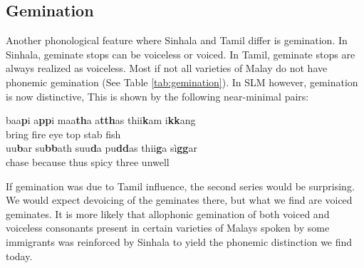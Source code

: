 \documentclass[a4paper,10pt]{article}
\newcommand{\ttrs}[2]{\parbox{3.5cm}{\em \textbf{#1} \em \\ `#2'}}
\newcommand{\nixbox}{\fbox{\parbox{2cm}{~ \\ ~}}}
\begin{document}
% 

\subsection{Gemination}
Another phonological feature where Sinhala and Tamil differ is gemination. In Sinhala, geminate stops can be voiceless or voiced. In Tamil, geminate stops are always realized as voiceless. Most if not all varieties of Malay do not have phonemic gemination (See Table \ref{tab:gemination}). In SLM however, gemination is now distinctive, This is shown by the following near-minimal pairs:

\ea
\ea
\gll  baa\textbf{p}i a\textbf{pp}i maa\textbf{th}a a\textbf{tth}as thii\textbf{k}am i\textbf{kk}ang\\
      bring fire eye top stab fish\\
\ex
\gll  uu\textbf{b}ar su\textbf{bb}ath  suu\textbf{d}a pu\textbf{dd}as thii\textbf{g}a sì\textbf{gg}ar \\
      chase because thus spicy three unwell \\
\z
\z

If gemination was due to Tamil influence, the second series would be surprising. We would expect devoicing of the geminates there, but what we find are voiced geminates. It is more likely that allophonic gemination of both voiced and voiceless consonants present in certain varieties of Malays spoken by some immigrants was reinforced by Sinhala to yield the phonemic distinction we find today. 
\end{document}
